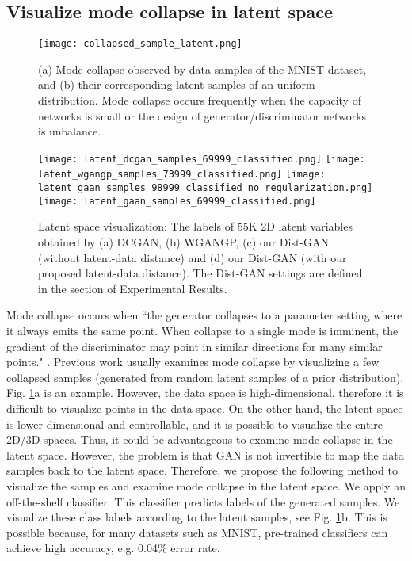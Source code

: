 \documentclass[runningheads]{llncs}
\newcommand*{\eg}{e.g. }
\begin{document}
\subsection{Visualize mode collapse in latent space}
\begin{figure}[t]
\centering
\texttt{[image: collapsed\_sample\_latent.png]}
\caption{(a) Mode collapse observed by data samples of the MNIST dataset, and (b) their corresponding latent samples of an uniform distribution. Mode collapse occurs frequently when the capacity of networks is small or the design of generator/discriminator networks is unbalance.}
\label{collapsed_mnist_dcgan}
\end{figure}
\begin{figure*}[t]
\centering
\texttt{[image: latent\_dcgan\_samples\_69999\_classified.png]}
\texttt{[image: latent\_wgangp\_samples\_73999\_classified.png]}
\texttt{[image: latent\_gaan\_samples\_98999\_classified\_no\_regularization.png]}
\texttt{[image: latent\_gaan\_samples\_69999\_classified.png]}
\caption{Latent space visualization: The labels of 55K 2D latent variables obtained by (a) DCGAN, (b) WGANGP, (c) our Dist-GAN (without latent-data distance) and (d) our Dist-GAN (with our proposed latent-data distance). The Dist-GAN settings are defined in the section of Experimental Results.}
\label{classified_mnist_dcgan}
\end{figure*}
Mode collapse occurs when ``the generator collapses to a parameter setting where it always emits the same point. When collapse to a single mode is imminent, the gradient of the discriminator may point in similar directions for many similar points." \cite{salimans-nisp-2016}. 
Previous work usually examines mode collapse by visualizing a few collapsed samples (generated from random latent samples of a prior distribution). Fig. \ref{collapsed_mnist_dcgan}a is an example. However, the data space is high-dimensional, therefore it is difficult to visualize points in the data space. On the other hand, the latent space is lower-dimensional and controllable, and it is possible to visualize the entire 2D/3D spaces. 
Thus, it could be advantageous to examine mode collapse in the latent space.
However, the problem is that GAN is not invertible to map the data samples back to the latent space.
Therefore, we propose the following method to visualize the samples and examine mode collapse in the latent space.
We apply an off-the-shelf classifier. This classifier predicts labels of the generated samples. We visualize these class labels according to the latent samples, see
Fig. \ref{collapsed_mnist_dcgan}b.
This is possible because, for many datasets such as MNIST, pre-trained classifiers  can achieve high accuracy, \eg 0.04\% error rate. 
\end{document}
